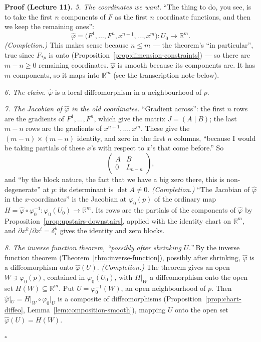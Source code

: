 \documentclass[11pt]{report}
\renewenvironment{proof}[1][Proof]{\noindent\textbf{#1.} }{\hfill$\square$\par\vspace{5pt}}
\begin{document}
\begin{proof}[Proof (Lecture 11)]
\emph{5. The coordinates we want.} ``The thing to do, you see, is to take the first $n$ components of $F$ as the first $n$ coordinate functions, and then we keep the remaining ones'':
\[
\hat\varphi = \big(F^1, \ldots, F^n, x^{n+1}, \ldots, x^m\big) : U_0 \to \mathbb{R}^m .
\]
\textit{(Completion.)} This makes sense because $n \le m$ --- the theorem's ``in particular'', true since $F_{*p}$ is onto (Proposition~\ref{prop:dimension-constraints}) --- so there are $m - n \ge 0$ remaining coordinates. $\hat\varphi$ is smooth because its components are. It has $m$ components, so it maps into $\mathbb{R}^m$ (see the transcription note below).

\emph{6. The claim.} $\hat\varphi$ is a local diffeomorphism in a neighbourhood of $p$.

\emph{7. The Jacobian of $\hat\varphi$ in the old coordinates.} ``Gradient across'': the first $n$ rows are the gradients of $F^1, \ldots, F^n$, which give the matrix $J = (A \mid B)$; the last $m - n$ rows are the gradients of $x^{n+1}, \ldots, x^m$. These give the $(m-n) \times (m-n)$ identity, and zero in the first $n$ columns, ``because I would be taking partials of these $x$'s with respect to $x$'s that come before.'' So
\[
\begin{pmatrix} A & B \\ 0 & I_{m-n} \end{pmatrix},
\]
and ``by the block nature, the fact that we have a big zero there, this is non-degenerate'' at $p$: its determinant is $\det A \ne 0$. \textit{(Completion.)} ``The Jacobian of $\hat\varphi$ in the $x$-coordinates'' is the Jacobian at $\varphi_0(p)$ of the ordinary map $H = \hat\varphi \circ \varphi_0^{-1} : \varphi_0(U_0) \to \mathbb{R}^m$. Its rows are the partials of the components of $\hat\varphi$ by Proposition~\ref{prop:upstairs-downstairs}, applied with the identity chart on $\mathbb{R}^m$, and $\partial x^k/\partial x^i = \delta^k_i$ gives the identity and zero blocks.

\emph{8. The inverse function theorem, ``possibly after shrinking $U$.''} By the inverse function theorem (Theorem~\ref{thm:inverse-function}), possibly after shrinking, $\hat\varphi$ is a diffeomorphism onto $\hat\varphi(U)$. \textit{(Completion.)} The theorem gives an open $W \ni \varphi_0(p)$, contained in $\varphi_0(U_0)$, with $H|_W$ a diffeomorphism onto the open set $H(W) \subseteq \mathbb{R}^m$. Put $U = \varphi_0^{-1}(W)$, an open neighbourhood of $p$. Then $\hat\varphi|_U = H|_W \circ \varphi_0|_U$ is a composite of diffeomorphisms (Proposition~\ref{prop:chart-diffeo}, Lemma~\ref{lem:composition-smooth}), mapping $U$ onto the open set $\hat\varphi(U) = H(W)$.


\end{proof}
\end{document}

